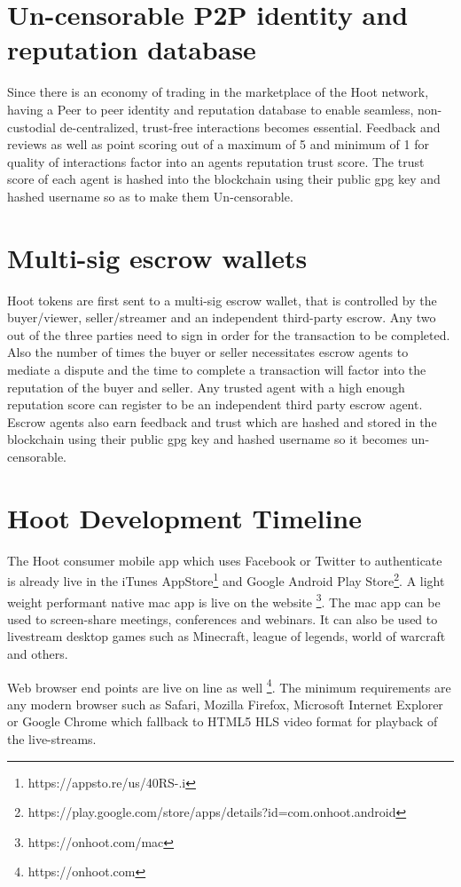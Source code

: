 \documentclass{article}
\begin{document}
\section{Un-censorable P2P identity and reputation database}
Since there is an economy of trading in the marketplace of the Hoot network, having a Peer to peer
identity and reputation database to enable seamless, non-custodial
de-centralized, trust-free interactions becomes essential. Feedback and reviews as well as point scoring out of a maximum of 5 and minimum of 1 for quality of interactions factor into an agents reputation trust score. The trust score of each agent is hashed into the blockchain using their public gpg key and hashed username so as to make them Un-censorable.

\section{Multi-sig escrow wallets}
Hoot tokens are first sent to a multi-sig escrow wallet, that is controlled by the buyer/viewer, seller/streamer and an
independent third-party escrow. Any
two out of the three parties need to sign in order for the transaction to be
completed. Also the number of times the buyer or seller necessitates
escrow agents to mediate a dispute and the time to complete a
transaction will factor into the reputation of the buyer and
seller. Any trusted agent with a high enough reputation score can
register to be an independent third party escrow agent. Escrow agents
also earn feedback and trust which are hashed and stored in the
blockchain using their public gpg key and hashed username so it
becomes un-censorable.

\section{Hoot Development Timeline}
The Hoot consumer mobile app which uses Facebook or Twitter to authenticate is already live in the iTunes AppStore\footnote{https://appsto.re/us/40RS-.i} and Google Android Play Store\footnote{https://play.google.com/store/apps/details?id=com.onhoot.android}.
A light weight performant native  mac app is live on
the website \footnote{https://onhoot.com/mac}. The mac app can be used to screen-share meetings, conferences and webinars. It can also be used
to livestream desktop games such as Minecraft, league of legends,
world of warcraft and others.

Web browser end points are live on line as well
\footnote{https://onhoot.com}. The minimum requirements are any modern
browser such as Safari, Mozilla Firefox, Microsoft Internet Explorer
or Google Chrome which fallback to HTML5 HLS video format for playback
of the live-streams.
\end{document}

